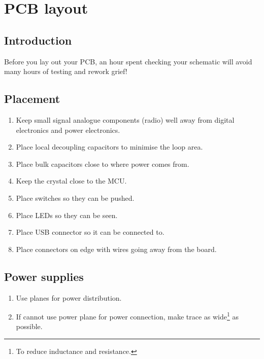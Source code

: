 \chapter{PCB layout}


\section{Introduction}
\label{PCB_introduction}

Before you lay out your PCB, an hour spent checking your schematic
will avoid many hours of testing and rework grief!


\label{pcb-recommendations}

\section{Placement}
\label{placement}

\begin{enumerate}
\item
  Keep small signal analogue components (radio) well away from digital
  electronics and power electronics.
\item
  Place local decoupling capacitors to minimise the loop area.
\item
  Place bulk capacitors close to where power comes from.
\item
  Keep the crystal close to the MCU.
\item
  Place switches so they can be pushed.
\item
  Place LEDs so they can be seen.
\item
  Place USB connector so it can be connected to.
\item
  Place connectors on edge with wires going away from the board.
\end{enumerate}


\section{Power supplies}

\begin{enumerate}
  
\item
  Use planes for power distribution.

\item
  If cannot use power plane for power connection, make trace as
  wide\footnote{To reduce inductance and resistance.}  as possible.

\end{enumerate}



